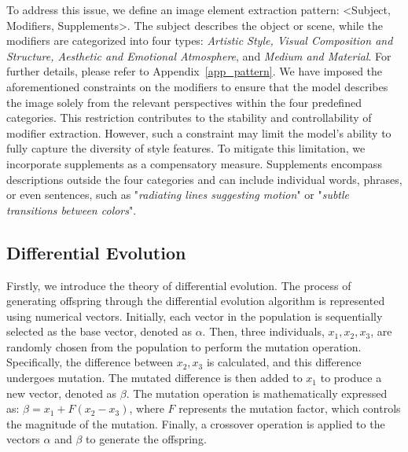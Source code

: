 To address this issue, we define an image element extraction pattern: <Subject, Modifiers, Supplements>. The subject describes the object or scene, while the modifiers are categorized into four types: \textit{Artistic Style, Visual Composition and Structure, Aesthetic and Emotional Atmosphere}, and \textit{Medium and Material}. For further details, please refer to Appendix~\ref{app_pattern}. We have imposed the aforementioned constraints on the modifiers to ensure that the model describes the image solely from the relevant perspectives within the four predefined categories. This restriction contributes to the stability and controllability of modifier extraction. However, such a constraint may limit the model’s ability to fully capture the diversity of style features. To mitigate this limitation, we incorporate supplements as a compensatory measure. Supplements encompass descriptions outside the four categories and can include individual words, phrases, or even sentences, such as "\textit{radiating lines suggesting motion}" or "\textit{subtle transitions between colors}".



\subsection{Differential Evolution} \label{diffevo}
Firstly, we introduce the theory of differential evolution. The process of generating offspring through the differential evolution algorithm is represented using numerical vectors. Initially, each vector in the population is sequentially selected as the base vector, denoted as $\alpha$. Then, three individuals, $x_{1}, x_{2}, x_{3}$, are randomly chosen from the population to perform the mutation operation. Specifically, the difference between $x_{2}, x_{3}$ is calculated, and this difference undergoes mutation. The mutated difference is then added to $x_{1}$ to produce a new vector, denoted as $\beta$. The mutation operation is mathematically expressed as: $\beta = x_{1} + F(x_{2} - x_{3})$, where $F$ represents the mutation factor, which controls the magnitude of the mutation. Finally, a crossover operation is applied to the vectors $\alpha$ and $\beta$ to generate the offspring.

